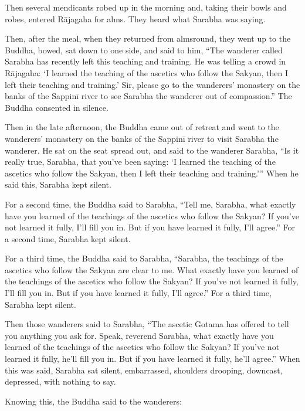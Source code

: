 \documentclass[12pt,openany]{book}%
\begin{document}
Then several mendicants robed up in the morning and, taking their bowls and robes, entered \textsanskrit{Rājagaha} for alms. They heard what Sarabha was saying. 

Then, after the meal, when they returned from almsround, they went up to the Buddha, bowed, sat down to one side, and said to him, “The wanderer called Sarabha has recently left this teaching and training. He was telling a crowd in \textsanskrit{Rājagaha}: ‘I learned the teaching of the ascetics who follow the Sakyan, then I left their teaching and training.’ Sir, please go to the wanderers’ monastery on the banks of the \textsanskrit{Sappinī} river to see Sarabha the wanderer out of compassion.” The Buddha consented in silence. 

Then in the late afternoon, the Buddha came out of retreat and went to the wanderers’ monastery on the banks of the \textsanskrit{Sappinī} river to visit Sarabha the wanderer. He sat on the seat spread out, and said to the wanderer Sarabha, “Is it really true, Sarabha, that you’ve been saying: ‘I learned the teaching of the ascetics who follow the Sakyan, then I left their teaching and training.’” When he said this, Sarabha kept silent. 

For a second time, the Buddha said to Sarabha, “Tell me, Sarabha, what exactly have you learned of the teachings of the ascetics who follow the Sakyan? If you’ve not learned it fully, I’ll fill you in. But if you have learned it fully, I’ll agree.” For a second time, Sarabha kept silent. 

For a third time, the Buddha said to Sarabha, “Sarabha, the teachings of the ascetics who follow the Sakyan are clear to me. What exactly have you learned of the teachings of the ascetics who follow the Sakyan? If you’ve not learned it fully, I’ll fill you in. But if you have learned it fully, I’ll agree.” For a third time, Sarabha kept silent. 

Then those wanderers said to Sarabha, “The ascetic Gotama has offered to tell you anything you ask for. Speak, reverend Sarabha, what exactly have you learned of the teachings of the ascetics who follow the Sakyan? If you’ve not learned it fully, he’ll fill you in. But if you have learned it fully, he’ll agree.” When this was said, Sarabha sat silent, embarrassed, shoulders drooping, downcast, depressed, with nothing to say. 

Knowing this, the Buddha said to the wanderers: 
\end{document}
